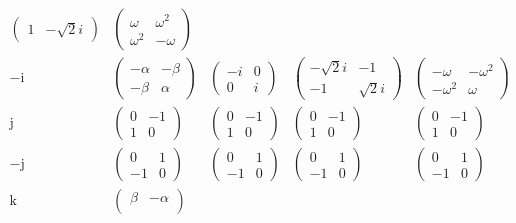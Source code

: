 \documentclass[
]{book}
\theoremstyle{definition}
\theoremstyle{definition}
\theoremstyle{definition}
\theoremstyle{definition}
\theoremstyle{remark}
\begin{document}
\[\begin{array}{ccccc}
\begin{pmatrix}
1 & -\sqrt{2}i
\end{pmatrix} & \begin{pmatrix}\omega & \omega^{2}\\
\omega^{2} & -\omega
\end{pmatrix}\\
-\mathrm{i} & \begin{pmatrix}-\alpha & -\beta\\
-\beta & \alpha
\end{pmatrix} & \begin{pmatrix}-i & 0\\
0 & i
\end{pmatrix} & \begin{pmatrix}-\sqrt{2}i & -1\\
-1 & \sqrt{2}i
\end{pmatrix} & \begin{pmatrix}-\omega & -\omega^{2}\\
-\omega^{2} & \omega
\end{pmatrix}\\
\mathrm{j} & \begin{pmatrix}0 & -1\\
1 & 0
\end{pmatrix} & \begin{pmatrix}0 & -1\\
1 & 0
\end{pmatrix} & \begin{pmatrix}0 & -1\\
1 & 0
\end{pmatrix} & \begin{pmatrix}0 & -1\\
1 & 0
\end{pmatrix}\\
-\mathrm{j} & \begin{pmatrix}0 & 1\\
-1 & 0
\end{pmatrix} & \begin{pmatrix}0 & 1\\
-1 & 0
\end{pmatrix} & \begin{pmatrix}0 & 1\\
-1 & 0
\end{pmatrix} & \begin{pmatrix}0 & 1\\
-1 & 0
\end{pmatrix}\\
\mathrm{k} & \begin{pmatrix}\beta & -\alpha\\

\end{pmatrix}
\end{array}\]
\end{document}
